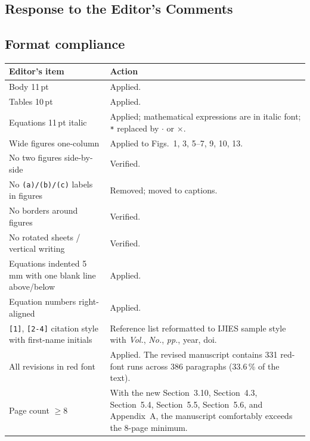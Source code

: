 \documentclass[11pt,a4paper]{article}
\newcommand{\sectref}[1]{Section~#1}
\begin{document}
\begin{itemize}
\section{Response to the Editor's Comments}

\subsection*{Format compliance}

\begin{small}
\begin{tabularx}{\linewidth}{p{4.6cm} X}
\toprule
\textbf{Editor's item} & \textbf{Action} \\
\midrule
Body 11\,pt                  & Applied. \\
Tables 10\,pt                & Applied. \\
Equations 11\,pt italic       & Applied; mathematical expressions are in italic font; \texttt{*} replaced by \texttt{$\cdot$} or \texttt{$\times$}. \\
Wide figures one-column      & Applied to Figs.~1, 3, 5--7, 9, 10, 13. \\
No two figures side-by-side  & Verified. \\
No \texttt{(a)/(b)/(c)} labels in figures & Removed; moved to captions. \\
No borders around figures    & Verified. \\
No rotated sheets / vertical writing & Verified. \\
Equations indented 5\,mm with one blank line above/below & Applied. \\
Equation numbers right-aligned & Applied. \\
\texttt{[1]}, \texttt{[2-4]} citation style with first-name initials & Reference list reformatted to IJIES sample style with \emph{Vol.}, \emph{No.}, \emph{pp.}, year, doi. \\
All revisions in \textcolor{revred}{red font} & Applied. The revised manuscript contains 331 red-font runs across 386 paragraphs (33.6\,\% of the text). \\
Page count $\geq 8$           & With the new \sectref{3.10}, \sectref{4.3}, \sectref{5.4}, \sectref{5.5}, \sectref{5.6}, and Appendix~A, the manuscript comfortably exceeds the 8-page minimum. \\
\bottomrule
\end{tabularx}
\end{small}




\end{itemize}
\end{document}
